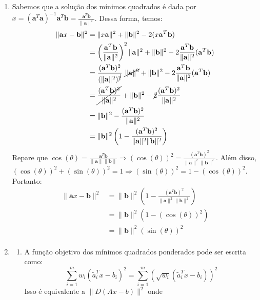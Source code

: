 \documentclass[a4paper,12pt]{article}
\newcommand{\vet}[1]{\mathbf{#1}}
\begin{document}
\begin{enumerate}
    \item Sabemos que a solução dos mínimos quadrados é dada por $x = (\vet{a}^T\vet{a})^{-1}\vet{a}^T\vet{b} = \frac{\vet{a}^T\vet{b}}{\|\vet{a}\|^2}$. Dessa forma, temos:
    \begin{align*}
        \|\vet{a}x - \vet{b}\|^2 &= \|x\vet{a}\|^2 + \|\vet{b}\|^2 -2 (x\vet{a}^T\vet{b})\\
        &=\left(\frac{\vet{a}^T\vet{b}}{\|\vet{a}\|^2} \right)^2 \|\vet{a}\|^2 + \|\vet{b}\|^2 -2 \frac{\vet{a}^T\vet{b}}{\|\vet{a}\|^2}(\vet{a}^T\vet{b})\\
        &=\frac{(\vet{a}^T\vet{b})^2}{(\|\vet{a}\|^2)^{\cancel{2}}}\  \cancel{ \|\vet{a}\|^2} + \|\vet{b}\|^2 -2 \frac{\vet{a}^T\vet{b}}{\|\vet{a}\|^2}(\vet{a}^T\vet{b})\\
        &=\cancel{\frac{(\vet{a}^T\vet{b})^2}{\|\vet{a}\|^2}} + \|\vet{b}\|^2 -\cancel{2} \frac{(\vet{a}^T\vet{b})^2}{\|\vet{a}\|^2}\\
        &= \|\vet{b}\|^2 -\frac{(\vet{a}^T\vet{b})^2}{\|\vet{a}\|^2}\\
        &= \|\vet{b}\|^2 \left(1 -\frac{(\vet{a}^T\vet{b})^2}{\|\vet{a}\|^2\|\vet{b}\|^2}\right)\\
    \end{align*}
    Repare que $\cos(\theta) = \frac{\vet{a}^T\vet{b}}{\|\vet{a}\|\|\vet{b}\|} \Rightarrow (\cos(\theta))^2 = \frac{(\vet{a}^T\vet{b})^2}{\|\vet{a}\|^2\|\vet{b}\|^2}$. Além disso, $(\cos(\theta))^2 + (\sin(\theta))^2 = 1 \Rightarrow( \sin(\theta))^2 = 1 - (\cos(\theta))^2$. Portanto:
    \begin{align*}
        \|\vet{a}x - \vet{b}\|^2 &=  \|\vet{b}\|^2 \left(1 -\frac{(\vet{a}^T\vet{b})^2}{\|\vet{a}\|^2\|\vet{b}\|^2}\right)\\
        &= \|\vet{b}\|^2 \left(1 -(\cos(\theta))^2\right)\\
        &= \|\vet{b}\|^2 (\sin(\theta))^2\\
    \end{align*}

    \item
    \begin{enumerate}
        \item A função objetivo dos mínimos quadrados ponderados pode ser escrita como:
        $$
        \sum_{i=1}^{m} w_i (\tilde{a}_i^T x - b_i)^2 = \sum_{i=1}^{m} (\sqrt{w_i}(\tilde{a}_i^T x -b_i))^2 
        $$
        Isso é equivalente a $\|D(Ax - b)\|^2$ onde


\end{enumerate}
\end{enumerate}
\end{document}
